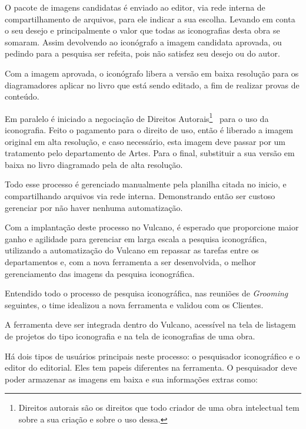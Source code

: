 \documentclass[
  12pt,            %
  openany,
  oneside,
  a4paper,         %
  english,      %
  brazil
]{article}
\numberwithin{figure}{section}
\numberwithin{table}{section}
\newcounter{subsubsubsection}[subsubsection]
\begin{document}
O pacote de imagens candidatas é enviado ao editor, via rede interna de compartilhamento de arquivos, para ele indicar a sua escolha. Levando em conta o seu desejo e principalmente o valor que todas as iconografias desta obra se somaram. Assim devolvendo ao iconógrafo a imagem candidata aprovada, ou pedindo para a pesquisa ser refeita, pois não satisfez seu desejo ou do autor.

Com a imagem aprovada, o iconógrafo libera a versão em baixa resolução para os diagramadores aplicar no livro que está sendo editado, a fim de realizar provas de conteúdo.

Em paralelo é iniciado a negociação de Direitos Autorais\footnote{Direitos autorais são os direitos que todo criador de uma obra intelectual tem sobre a sua criação e sobre o uso dessa.}~\cite{SEBRAE_DA} para o uso da iconografia. Feito o pagamento para o direito de uso, então é liberado a imagem original em alta resolução, e caso necessário, esta imagem deve passar por um tratamento pelo departamento de Artes. Para o final, substituir a sua versão em baixa no livro diagramado pela de alta resolução.


Todo esse processo é gerenciado manualmente pela planilha citada no inicio, e compartilhando arquivos via rede interna. Demonstrando então ser custoso gerenciar por não haver nenhuma automatização.

Com a implantação deste processo no Vulcano, é esperado que proporcione maior ganho e agilidade para gerenciar em larga escala a pesquisa iconográfica, utilizando a automatização do Vulcano em repassar as tarefas entre os departamentos e, com a nova ferramenta a ser desenvolvida, o melhor gerenciamento das imagens da pesquisa iconográfica.



Entendido todo o processo de pesquisa iconográfica, nas reuniões de \textit{Grooming} seguintes, o time idealizou a nova ferramenta e validou com os Clientes.

A ferramenta deve ser integrada dentro do Vulcano, acessível na tela de listagem de projetos do tipo iconografia e na tela de iconografias de uma obra.

Há dois tipos de usuários principais neste processo: o pesquisador iconográfico e o editor do editorial. Eles tem papeis diferentes na ferramenta. O pesquisador deve poder armazenar as imagens em baixa e sua informações extras como:
\end{document}
